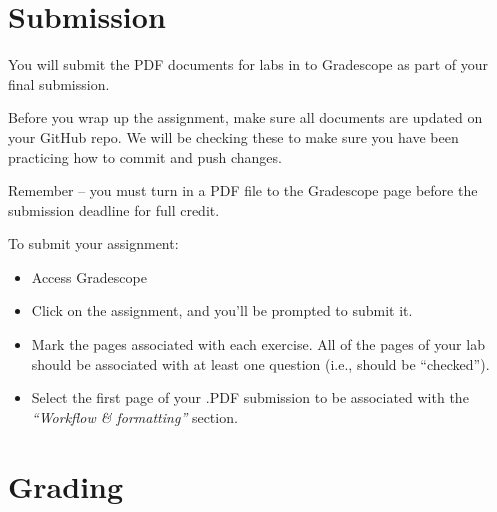 \documentclass[
  letterpaper,
  DIV=11,
  numbers=noendperiod]{scrartcl}
\begin{document}
\section{Submission}\label{submission}

You will submit the PDF documents for labs in to Gradescope as part of
your final submission.

\begin{tcolorbox}[enhanced jigsaw, leftrule=.75mm, bottomtitle=1mm, breakable, colback=white, toprule=.15mm, toptitle=1mm, left=2mm, colbacktitle=quarto-callout-warning-color!10!white, colframe=quarto-callout-warning-color-frame, opacitybacktitle=0.6, titlerule=0mm, coltitle=black, opacityback=0, title=\textcolor{quarto-callout-warning-color}{\faExclamationTriangle}\hspace{0.5em}{Warning}, arc=.35mm, rightrule=.15mm, bottomrule=.15mm]

Before you wrap up the assignment, make sure all documents are updated
on your GitHub repo. We will be checking these to make sure you have
been practicing how to commit and push changes.

Remember -- you must turn in a PDF file to the Gradescope page before
the submission deadline for full credit.

\end{tcolorbox}

To submit your assignment:

\begin{itemize}
\item
  Access Gradescope
\item
  Click on the assignment, and you'll be prompted to submit it.
\item
  Mark the pages associated with each exercise. All of the pages of your
  lab should be associated with at least one question (i.e., should be
  ``checked'').
\item
  Select the first page of your .PDF submission to be associated with
  the \emph{``Workflow \& formatting''} section.
\end{itemize}

\section{Grading}\label{grading}
\end{document}
